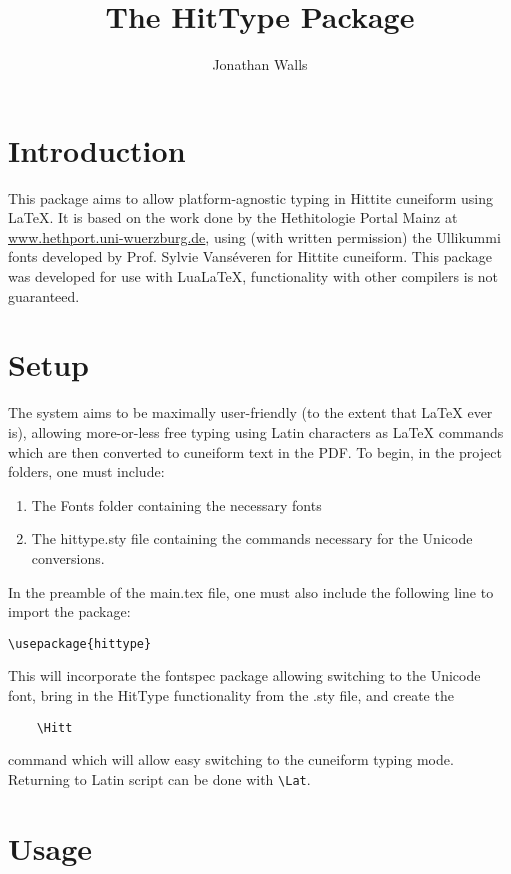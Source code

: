 \documentclass[12pt,A4]{article}
\title{The HitType Package}
\author{Jonathan Walls}
\begin{document}
\maketitle

\section{Introduction}
This package aims to allow platform-agnostic typing in Hittite cuneiform using LaTeX. It is based on the work done by the Hethitologie Portal Mainz at \href{https://www.hethport.uni-wuerzburg.de/cuneifont/}{www.hethport.uni-wuerzburg.de}, using (with written permission) the Ullikummi fonts developed by Prof. Sylvie Vanséveren for Hittite cuneiform. This package was developed for use with LuaLaTeX, functionality with other compilers is not guaranteed.

\section{Setup}
The system aims to be maximally user-friendly (to the extent that LaTeX ever is), allowing more-or-less free typing using Latin characters as LaTeX commands which are then converted to cuneiform text in the PDF. To begin, in the project folders, one must include:
\begin{enumerate}
    \item The Fonts folder containing the necessary fonts
    \item The hittype.sty file containing the commands necessary for the Unicode conversions.
\end{enumerate}

In the preamble of the main.tex file, one must also include the following line to import the package:\small
\begin{verbatim}
\usepackage{hittype}
\end{verbatim}
\normalsize
This will incorporate the fontspec package allowing switching to the Unicode font, bring in the HitType functionality from the .sty file, and create the 
\begin{verbatim}
    \Hitt
\end{verbatim} 
command which will allow easy switching to the cuneiform typing mode. Returning to Latin script can be done with \verb|\Lat|.

\section{Usage}
\end{document}
